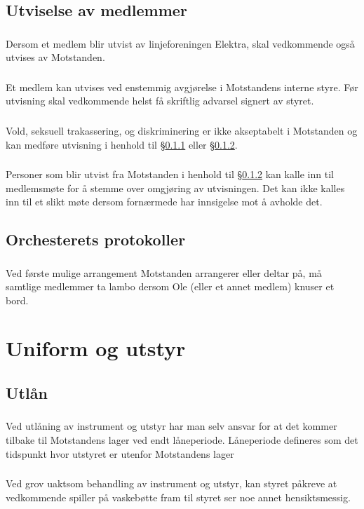 \documentclass{article}
\newenvironment{statute}[1][]
    {
        \titleformat{\subsubsection}[runin]{\normalfont}{\hspace{1pt}\textit{\S\hspace{5pt}\thesubsubsection}}{0pt}{\rule{4pt}{0pt}}{}
        \subsubsection{}#1
        \begin{minipage}[t]{0.9\linewidth}
    }
    {
        \end{minipage}
        
        \ignorespacesafterend
    }
\begin{document}
        \subsection{Utviselse av medlemmer}
        	\begin{statute}[\label{utvisning_av_elektrastyret}]
        		Dersom et medlem blir utvist av linjeforeningen Elektra, skal vedkommende også utvises av Motstanden.
        	\end{statute}
            \begin{statute}[\label{utvisning_av_styret}]
                Et medlem kan utvises ved enstemmig avgjørelse i Motstandens interne styre. Før utvisning skal vedkommende helst få skriftlig advarsel signert av styret.
            \end{statute}
            \begin{statute}
                Vold, seksuell trakassering, og diskriminering er ikke akseptabelt i Motstanden og kan medføre utvisning i henhold til \S\hspace{3pt}\ref{utvisning_av_elektrastyret} eller  \S\hspace{3pt}\ref{utvisning_av_styret}.
            \end{statute}
			\begin{statute}
				Personer som blir utvist fra Motstanden i henhold til \S\hspace{3pt}\ref{utvisning_av_styret} kan kalle inn til medlemsmøte for å stemme over omgjøring av utvisningen. Det kan ikke kalles inn til et slikt møte dersom fornærmede har innsigelse mot å avholde det.
			\end{statute}

        \subsection{Orchesterets protokoller}
            \begin{statute}
                Ved første mulige arrangement Motstanden arrangerer eller deltar på, må samtlige medlemmer ta lambo dersom Ole (eller et annet medlem) knuser et bord.     
            \end{statute}
        
    \section{Uniform og utstyr}
        \subsection{Utlån}
                \begin{statute}
                    Ved utlåning av instrument og utstyr har man selv ansvar for at det kommer tilbake til Motstandens lager ved endt låneperiode. Låneperiode defineres som det tidspunkt hvor utstyret er utenfor Motstandens lager
                \end{statute}
                \begin{statute}
                    Ved grov uaktsom behandling av instrument og utstyr, kan styret påkreve at vedkommende spiller på vaskebøtte fram til styret ser noe annet hensiktsmessig. 
                \end{statute}
\end{document}
